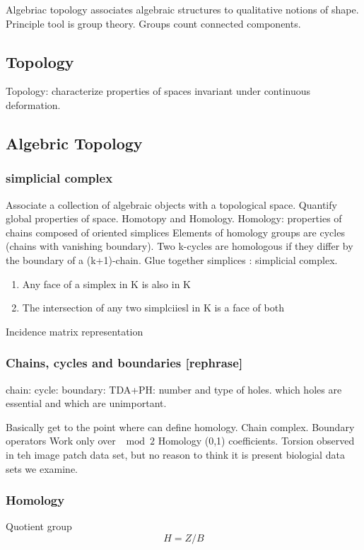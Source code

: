 Algebriac topology associates algebraic structures to qualitative notions of shape.
Principle tool is group theory.
Groups count connected components.

\subsection{Topology}

Topology: characterize properties of spaces invariant under continuous deformation.

\subsection{Algebric Topology}

\subsubsection{simplicial complex}
Associate a collection of algebraic objects with a topological space.
Quantify global properties of space.
Homotopy and Homology.
Homology: properties of chains composed of oriented simplices
Elements of homology groups are cycles (chains with vanishing boundary).
Two k-cycles are homologous if they differ by the boundary of a (k+1)-chain.
Glue together simplices : simplicial complex.

\begin{enumerate}
\item Any face of a simplex in K is also in K
\item The intersection of any two simplciiesl in K is a face of both 
\end{enumerate}
Incidence matrix representation

\subsubsection{Chains, cycles and boundaries [rephrase]}
chain:
cycle:
boundary: 
TDA+PH: number and type of holes. which holes are essential and which are unimportant.

Basically get to the point where can define homology.
Chain complex.
Boundary operators
Work only over $\mod 2$ Homology (0,1) coefficients.
Torsion observed in teh image patch data set, but no reason to think it is present biologial data sets we examine.


\subsubsection{Homology}
Quotient group
\begin{equation}
  H = Z / B
\end{equation}

